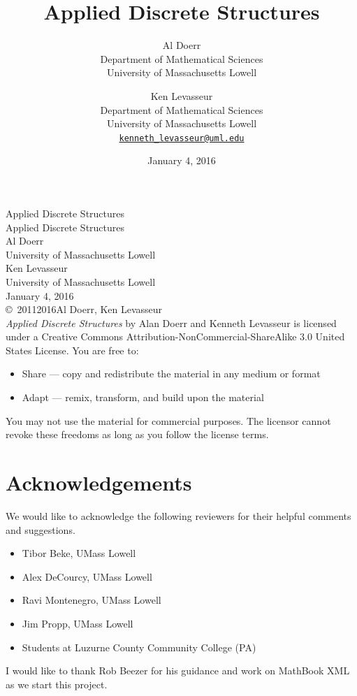 \documentclass[10pt,]{book}
\title{Applied Discrete Structures}
\author{Al Doerr\\
Department of Mathematical Sciences\\
University of Massachusetts Lowell\\
\href{mailto:}{\nolinkurl{}}
\and
Ken Levasseur\\
Department of Mathematical Sciences\\
University of Massachusetts Lowell\\
\href{mailto:kenneth_levasseur@uml.edu}{\nolinkurl{kenneth_levasseur@uml.edu}}
}
\date{January 4, 2016}
\theoremstyle{plain}
\theoremstyle{definition}
\begin{document}
\frontmatter
\thispagestyle{empty}
{\centering
\vspace*{0.28\textheight}
{\Huge Applied Discrete Structures}\\}
\clearpage
\thispagestyle{empty}
\null%
\clearpage
\thispagestyle{empty}
{\centering
\vspace*{0.14\textheight}
{\Huge Applied Discrete Structures}\\[3\baselineskip]
{\Large Al Doerr}\\[0.5\baselineskip]
{\Large University of Massachusetts Lowell}\\[3\baselineskip]
{\Large Ken Levasseur}\\[0.5\baselineskip]
{\Large University of Massachusetts Lowell}\\[3\baselineskip]
{\Large January 4, 2016}\\}
\clearpage
\thispagestyle{empty}
\noindent\copyright\ 2011\textendash{}2016\quad{}Al Doerr, Ken Levasseur\\[0.5\baselineskip]
\emph{Applied Discrete Structures} by Alan Doerr and Kenneth Levasseur is licensed under a Creative Commons Attribution-NonCommercial-ShareAlike 3.0 United States License. You are free to:
			\leavevmode%
\begin{itemize}[label=\textbullet]
\item{}Share — copy and redistribute the material in any medium or format\item{}Adapt — remix, transform, and build upon the material\end{itemize}

			You may not use the material for commercial purposes.  The licensor cannot revoke these freedoms as long as you follow the license terms.%

			\par
{}
\null\clearpage
\chapter*{Acknowledgements}\label{acknowledgement-1}
We would like to acknowledge the following reviewers for their helpful comments and suggestions. %
\leavevmode%
\begin{itemize}[label=\textbullet]
\item{}Tibor Beke, UMass Lowell\item{}Alex DeCourcy, UMass Lowell\item{}Ravi Montenegro, UMass Lowell\item{}Jim Propp, UMass Lowell\item{}Students at Luzurne County Community College (PA)\end{itemize}
\par
I would  like to thank Rob Beezer for his guidance and work on MathBook XML as we start this project.%
\end{document}
